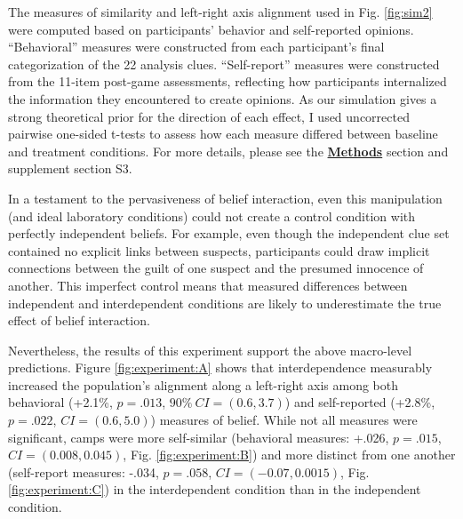 \documentclass[9pt,twocolumn,twoside,lineno]{pnas-new}
\begin{document}
The measures of similarity and left-right axis alignment used in Fig. \ref{fig:sim2} 
were computed based on participants’ behavior and self-reported opinions.
``Behavioral'' measures were constructed from each participant’s final categorization of the 22  analysis clues. 
“Self-report” measures were constructed from the 11-item post-game assessments, reflecting how participants internalized the information they encountered to create opinions. As our simulation gives a strong theoretical prior for the direction of each effect, I used uncorrected pairwise one-sided t-tests to assess how each measure differed between baseline and treatment conditions. 
For more details, please see the \hyperref[methods]{\textbf{Methods}} section and supplement section S3.


In a testament to the pervasiveness of belief interaction, even this manipulation (and ideal laboratory conditions) could not create a control condition with perfectly independent beliefs. For example, even though the independent clue set contained no explicit links between suspects, participants could draw implicit connections between the guilt of one suspect and the presumed innocence of another. This imperfect control means that measured differences between independent and interdependent conditions are likely to underestimate the true effect of belief interaction.

Nevertheless, the results of this experiment support the above macro-level predictions. Figure \ref{fig:experiment:A} shows that interdependence measurably increased the population’s alignment along a left-right axis among both behavioral (+2.1\%, $p=.013$, $90\%~CI=(0.6,3.7)$) and self-reported (+2.8\%, $p=.022$, $CI=(0.6,5.0)$) measures of belief. While not all measures were significant, camps were more self-similar (behavioral measures: +.026, $p=.015$, $CI=(0.008,0.045)$, Fig. \ref{fig:experiment:B}) and more distinct from one another (self-report measures: -.034, $p=.058$, $CI=(-0.07,0.0015)$, Fig. \ref{fig:experiment:C}) in the interdependent condition than in the independent condition.
\end{document}
